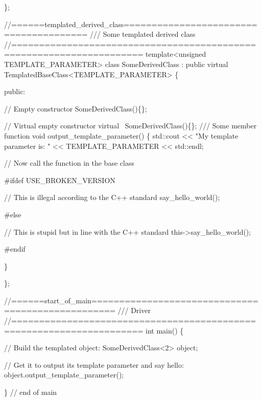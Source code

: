 \begin{DoxyCodeInclude}
\};



\textcolor{comment}{//======templated\_derived\_class=======================================}\textcolor{comment}{}
\textcolor{comment}{/// Some templated derived class}
\textcolor{comment}{}\textcolor{comment}{//=====================================================================}
\textcolor{keyword}{template}<\textcolor{keywordtype}{unsigned} TEMPLATE\_PARAMETER>
\textcolor{keyword}{class }SomeDerivedClass : \textcolor{keyword}{public} \textcolor{keyword}{virtual} TemplatedBaseClass<TEMPLATE\_PARAMETER>
\{

\textcolor{keyword}{public}:

 \textcolor{comment}{// Empty constructor}
 SomeDerivedClass()\{\};

 \textcolor{comment}{// Virtual empty constructor}
 \textcolor{keyword}{virtual} ~SomeDerivedClass()\{\};
\textcolor{comment}{}
\textcolor{comment}{ /// Some member function}
\textcolor{comment}{} \textcolor{keywordtype}{void} output\_template\_parameter()
  \{
   std::cout << \textcolor{stringliteral}{"My template parameter is: "} 
             << TEMPLATE\_PARAMETER << std::endl;

   \textcolor{comment}{// Now call the function in the base class}

\textcolor{preprocessor}{#ifdef USE\_BROKEN\_VERSION}

   \textcolor{comment}{// This is illegal according to the C++ standard }
   say\_hello\_world();

\textcolor{preprocessor}{#else }

   \textcolor{comment}{// This is stupid but in line with the C++ standard}
   this->say\_hello\_world();
 
\textcolor{preprocessor}{#endif}

  \}

\};


\textcolor{comment}{//======start\_of\_main==================================================}\textcolor{comment}{}
\textcolor{comment}{/// Driver}
\textcolor{comment}{}\textcolor{comment}{//=====================================================================}
\textcolor{keywordtype}{int} main()
\{

 \textcolor{comment}{// Build the templated object:}
 SomeDerivedClass<2> object;

 \textcolor{comment}{// Get it to output its template parameter and say hello:}
 \textcolor{keywordtype}{object}.output\_template\_parameter();

\} \textcolor{comment}{// end of main}

\end{DoxyCodeInclude}


